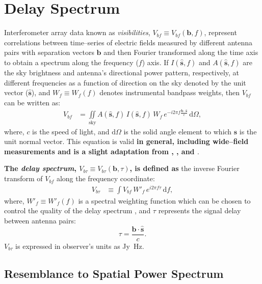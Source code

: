 \documentclass[preprint2,iop,numberedappendix]{emulateapj}
\newcommand{\dif}{\mathrm{d}}
\begin{document}
\section{Delay Spectrum}\label{sec:delay-spectrum}

Interferometer array data known as {\it visibilities}, $V_{bf}\equiv V_{bf}(\boldsymbol{b},f)$, represent correlations between time--series of electric fields measured by different antenna pairs with separation vectors $\boldsymbol{b}$ and then Fourier transformed along the time axis to obtain a spectrum along the frequency ($f$) axis. If $I(\hat{\boldsymbol{s}},f)$ and $A(\hat{\boldsymbol{s}},f)$ are the sky brightness and antenna's directional power pattern, respectively, at different frequencies as a function of direction on the sky denoted by the unit vector ($\hat{\boldsymbol{s}}$), and $W_f\equiv W_f(f)$ denotes instrumental bandpass weights, then $V_{bf}$ can be written as:
\begin{align}\label{eqn:obsvis}
  V_{bf} &= \iint\limits_\textrm{sky} A(\hat{\boldsymbol{s}},f)\,I(\hat{\boldsymbol{s}},f)\,W_f\,e^{-i2\pi f\frac{\boldsymbol{b}\cdot\hat{\boldsymbol{s}}}{c}}\,\dif\Omega,
\end{align}
where, $c$ is the speed of light, and $\dif\Omega$ is the solid angle element to which $\hat{\boldsymbol{s}}$ is the unit normal vector. This equation is valid {\bf in general, including wide--field measurements and is a slight adaptation from \citet{van34}, \citet{zer38}, and \citet{tho01}}.

{\bf The {\it delay spectrum}, $V_{b\tau}\equiv V_{b\tau}(\boldsymbol{b},\tau)$, is defined as} the inverse Fourier transform of $V_{bf}$ along the frequency coordinate:
\begin{align}\label{eqn:delay-transform}
  V_{b\tau} &\equiv \int V_{bf}\,W'_f\,e^{i2\pi f\tau}\,\dif f,
\end{align}
where, $W'_f\equiv W'_f(f)$ is a spectral weighting function which can be chosen to control the quality of the delay spectrum \citep{thy13,ved12}, and $\tau$ represents the signal delay between antenna pairs:
\begin{equation}\label{eqn:delay}
  \tau = \frac{\boldsymbol{b}\cdot\hat{\boldsymbol{s}}}{c}.
\end{equation}
$V_{b\tau}$ is expressed in observer's units as Jy~Hz.

\subsection{Resemblance to Spatial Power Spectrum}\label{sec:power-spectrum}
\end{document}
